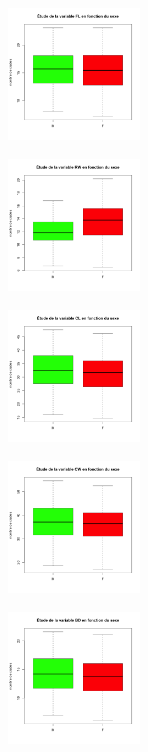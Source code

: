 \documentclass[]{report}
\begin{document}
\begin{center}
	\begin{minipage}[t]{0.3\textwidth}
		\includegraphics[width=35mm]{Figures/Crabs/bxp_sex_fl.png}
	\end{minipage}
	\begin{minipage}[t]{0.3\textwidth}
		\includegraphics[width=35mm]{Figures/Crabs/bxp_sex_rw.png}	
	\end{minipage}
	\begin{minipage}[t]{0.3\textwidth}
		\includegraphics[width=35mm]{Figures/Crabs/bxp_sex_cl.png}
	\end{minipage}
	\newline
	\begin{minipage}[t]{0.4\textwidth}
		\includegraphics[width=35mm]{Figures/Crabs/bxp_sex_cw.png}	
	\end{minipage}
	\begin{minipage}[t]{0.4\textwidth}
		\includegraphics[width=35mm]{Figures/Crabs/bxp_sex_bd.png}
	\end{minipage}
\end{center}
\end{document}
